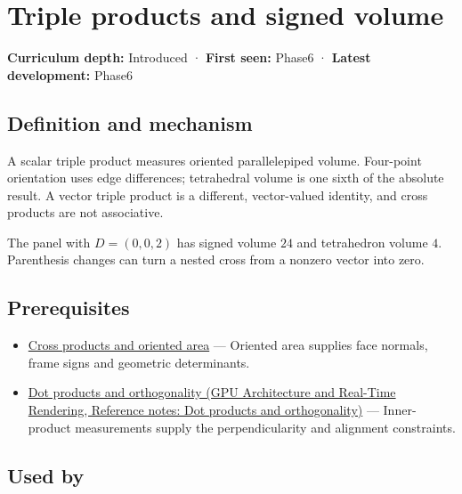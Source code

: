 \hypertarget{appendix-5caa058bd9c7}{}\label{referencestart:appendix-5caa058bd9c7}
\section{Triple products and signed volume}\label{appendix-5caa058bd9c7-triple-products-and-signed-volume}

\textbf{Curriculum depth:} Introduced · \textbf{First seen:} Phase6 · \textbf{Latest development:} Phase6

\begin{allmightroledefinition}

\subsection{Definition and mechanism}\label{appendix-5caa058bd9c7-definition-and-mechanism}

A scalar triple product measures oriented parallelepiped volume. Four-point orientation uses edge differences; tetrahedral volume is one sixth of the absolute result. A vector triple product is a different, vector-valued identity, and cross products are not associative.

\end{allmightroledefinition}

The panel with \(D=(0,0,2)\) has signed volume \(24\) and tetrahedron volume \(4\). Parenthesis changes can turn a nested cross from a nonzero vector into zero.

\subsection{Prerequisites}\label{appendix-5caa058bd9c7-prerequisites}

\begin{itemize}
\tightlist
\item
  \hyperref[appendix-2391db8052b1]{Cross products and oriented area} --- Oriented area supplies face normals, frame signs and geometric determinants.
\item
  \href{../06-GPU-Architecture-and-Real-Time-Rendering/main.pdf\#nameddest=appendix-8bc4e8fc547c}{Dot products and orthogonality (GPU Architecture and Real-Time Rendering, Reference notes: Dot products and orthogonality)} --- Inner-product measurements supply the perpendicularity and alignment constraints.
\end{itemize}

\subsection{Used by}\label{appendix-5caa058bd9c7-used-by}

